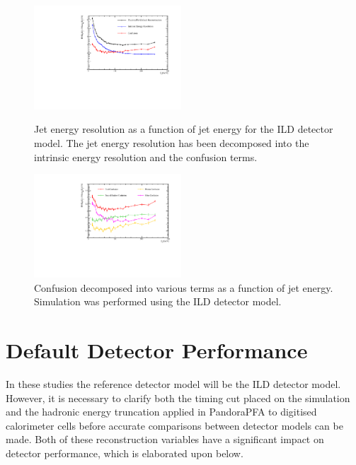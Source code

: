 \documentclass[final,3p,times,twocolumn]{elsarticle}
\begin{document}
\begin{figure}[!h]
  \begin{center}
     \includegraphics[width=0.49\textwidth]{3_Implementation/DetailedPlot.pdf}
     \caption{Jet energy resolution as a function of jet energy for the ILD detector model.  The jet energy resolution has been decomposed into the intrinsic energy resolution and the confusion terms.  \label{2-Decomp}}
  \end{center}
    \begin{center}
     \includegraphics[width=0.49\textwidth]{3_Implementation/Confusion.pdf}
     \caption{Confusion decomposed into various terms as a function of jet energy.  Simulation was performed using the ILD detector model.  \label{2-Conf}}
  \end{center}
\end{figure}


\section{Default Detector Performance}

In these studies the reference detector model will be the ILD detector model.  However, it is necessary to clarify both the timing cut placed on the simulation and the hadronic energy truncation applied in PandoraPFA to digitised calorimeter cells before accurate comparisons between detector models can be made.  Both of these reconstruction variables have a significant impact on detector performance, which is elaborated upon below.  
\end{document}
